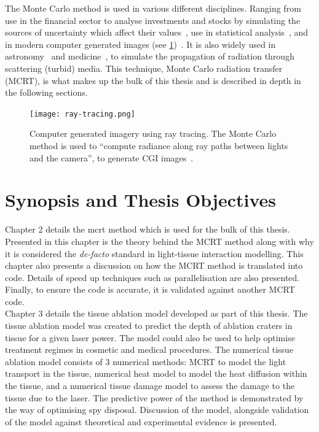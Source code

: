 The Monte Carlo method is used in various different disciplines. Ranging from use in the financial sector to analyse investments and stocks by simulating the sources of uncertainty which affect their values~\cite{jackel2002monte,finaceprrof}, use in statistical analysis~\cite{wall2012practical}, and in modern computer generated images (see \cref{fig:ray-trace})~\cite{Kajiyarendering,Cookraytracing}. It is also widely used in astronomy~\cite{robitaille2011hyperion,harries2014torus} and medicine~\cite{valentine2011monte,campbell2015monte}, to simulate the propagation of radiation through scattering (turbid) media. This technique, Monte Carlo radiation transfer (MCRT), is what makes up the bulk of this thesis and is described in depth in the following sections.

\begin{figure}[!htbp]
\centering
\texttt{[image: ray-tracing.png]}
\caption{Computer generated imagery using ray tracing. The Monte Carlo method is used to ``compute radiance along ray paths between lights and the camera'', to generate CGI images~\cite{pharr2016physically}.}
\label{fig:ray-trace}
\end{figure}


\section{Synopsis and Thesis Objectives}

Chapter 2 details the \gls*{mcrt} method which is used for the bulk of this thesis.
Presented in this chapter is the theory behind the MCRT method along with why it is considered the \textit{de-facto} standard in light-tissue interaction modelling.
This chapter also presents a discussion on how the MCRT method is translated into code.
Details of speed up techniques such as parallelisation are also presented.
Finally, to ensure the code is accurate, it is validated against another MCRT code.\\


Chapter 3 details the tissue ablation model developed as part of this thesis.
The tissue ablation model was created to predict the depth of ablation craters in tissue for a given laser power.
The model could also be used to help optimise treatment regimes in cosmetic and medical procedures.
The numerical tissue ablation model consists of 3 numerical methods: MCRT to model the light transport in the tissue, numerical heat model to model the heat diffusion within the tissue, and a numerical tissue damage model to assess the damage to the tissue due to the laser.
The predictive power of the method is demonstrated by the way of optimising spy disposal.
Discussion of the model, alongside validation of the model against theoretical and experimental evidence is presented.\\


